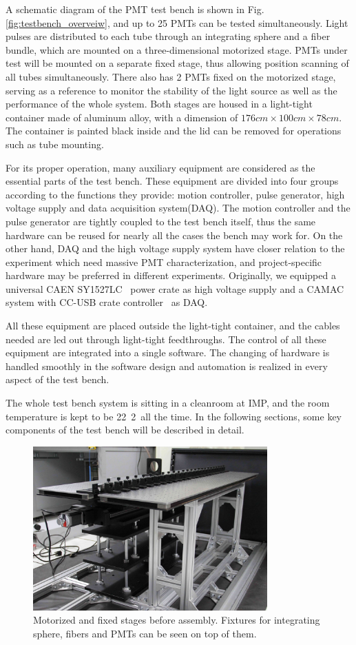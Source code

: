 \documentclass[review, times]{elsarticle}
\begin{document}
A schematic diagram of the PMT test bench is shown in Fig.\ref{fig:testbench_overveiw}, and up to 25 PMTs can be tested simultaneously.
Light pulses are distributed to each tube through an integrating sphere and a fiber bundle, which are mounted on a three-dimensional motorized stage.
PMTs under test will be mounted on a separate fixed stage, thus allowing position scanning of all tubes simultaneously.
There also has 2 PMTs fixed on the motorized stage, serving as a reference to monitor the stability of the light source as well as the performance of the whole system.
Both stages are housed in a light-tight container made of aluminum alloy, with a dimension of $176cm\times100cm\times78cm$.
The container is painted black inside and the lid can be removed for operations such as tube mounting.

For its proper operation, many auxiliary equipment are considered as the essential parts of the test bench. These equipment are divided into four groups according to the functions they provide: motion controller, pulse generator, high voltage supply and data acquisition system(DAQ).
The motion controller and the pulse generator are tightly coupled to the test bench itself, thus the same hardware can be reused for nearly all the cases the bench may work for.
On the other hand, DAQ and the high voltage supply system have closer relation to the experiment which need massive PMT characterization, and project-specific hardware may be preferred in different experiments. Originally, we equipped a universal CAEN SY1527LC~\cite{sy1527lc} power crate as high voltage supply and a CAMAC system with CC-USB crate controller~\cite{cc_usb} as DAQ.

All these equipment are placed outside the light-tight container, and the cables needed are led out through light-tight feedthroughs.
The control of all these equipment are integrated into a single software. The changing of hardware is handled smoothly in the software design and automation is realized in every aspect of the test bench.

The whole test bench system is sitting in a cleanroom at IMP, and the room temperature is kept to be 22\textpm~2\textcelsius~all the time. 
In the following sections, some key components of the test bench will be described in detail.

\begin{figure}
 \centering
 \includegraphics[width=90mm]{stage1_crop}
\caption{Motorized and fixed stages before assembly.
Fixtures for integrating sphere, fibers and PMTs can be seen on top of them.}
\label{fig:stages}
\end{figure} 
\end{document}
